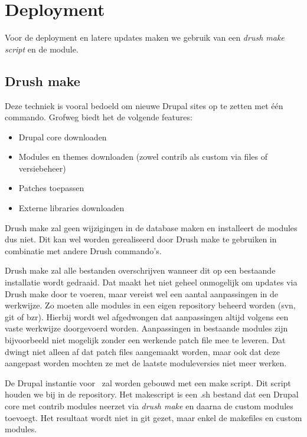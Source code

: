 \section{Deployment}\label{deployment}

Voor de deployment en latere updates maken we gebruik van een \emph{drush make script} en de  module.

\subsection{Drush make}

Deze techniek is vooral bedoeld om nieuwe Drupal sites op te zetten met \'{e}\'{e}n commando. Grofweg biedt het de volgende features:

\begin{itemize}
  \item Drupal core downloaden
  \item Modules en themes downloaden (zowel contrib als custom via files of versiebeheer)
  \item Patches toepassen
  \item Externe libraries downloaden
\end{itemize}

Drush make zal geen wijzigingen in de database maken en installeert de modules dus niet. Dit kan wel worden gerealiseerd door Drush make te gebruiken in combinatie met andere Drush commando's.

Drush make zal alle bestanden overschrijven wanneer dit op een bestaande installatie wordt gedraaid. Dat maakt het niet geheel onmogelijk om updates via Drush make door te voeren, maar vereist wel een aantal aanpassingen in de werkwijze. Zo moeten alle modules in een eigen repository beheerd worden (svn, git of bzr). Hierbij wordt wel afgedwongen dat aanpassingen altijd volgens een vaste werkwijze doorgevoerd worden. Aanpassingen in bestaande modules zijn bijvoorbeeld niet mogelijk zonder een werkende patch file mee te leveren. Dat dwingt niet alleen af dat patch files aangemaakt worden, maar ook dat deze aangepast worden mochten ze met de laatste moduleversies niet meer werken.

De Drupal instantie voor \thecustomer \ zal worden gebouwd met een make script. Dit script houden we bij in de repository. Het makescript is een .sh bestand dat een Drupal core met contrib modules neerzet via \emph{drush make} en daarna de custom modules toevoegt. Het resultaat wordt niet in git gezet, maar enkel de makefiles en custom modules.

